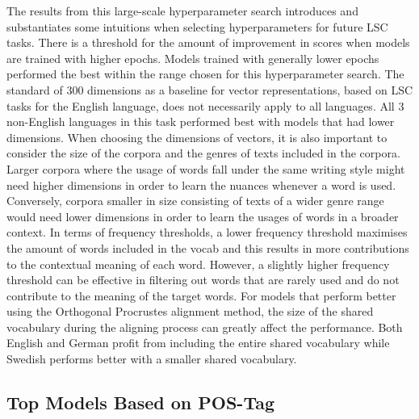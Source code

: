 The results from this large-scale hyperparameter search introduces and substantiates some intuitions when selecting hyperparameters for future LSC tasks. There is a threshold for the amount of improvement in scores when models are trained with higher epochs. Models trained with generally lower epochs performed the best within the range chosen for this hyperparameter search. The standard of 300 dimensions as a baseline for vector representations, based on LSC tasks for the English language, does not necessarily apply to all languages. All 3 non-English languages in this task performed best with models that had lower dimensions. When choosing the dimensions of vectors, it is also important to consider the size of the corpora and the genres of texts included in the corpora. Larger corpora where the usage of words fall under the same writing style might need higher dimensions in order to learn the nuances whenever a word is used. Conversely, corpora smaller in size consisting of texts of a wider genre range would need lower dimensions in order to learn the usages of words in a broader context. In terms of frequency thresholds, a lower frequency threshold maximises the amount of words included in the vocab and this results in more contributions to the contextual meaning of each word. However, a slightly higher frequency threshold can be effective in filtering out words that are rarely used and do not contribute to the meaning of the target words. For models that perform better using the Orthogonal Procrustes alignment method, the size of the shared vocabulary during the aligning process can greatly affect the performance. Both English and German profit from including the entire shared vocabulary while Swedish performs better with a smaller shared vocabulary.

\subsection{Top Models Based on POS-Tag}

